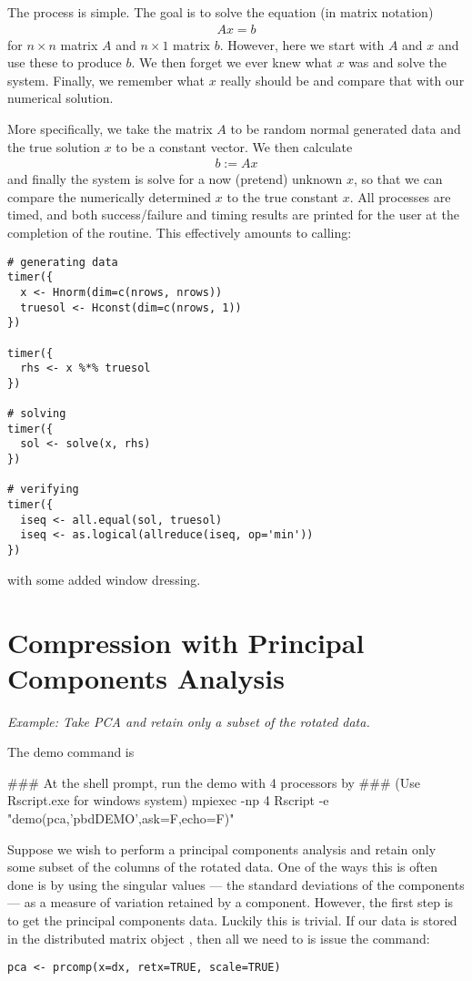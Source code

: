 The process is simple.  The goal is to solve the equation (in matrix notation)
\begin{align*}
Ax=b
\end{align*}
for $n\times n$ matrix $A$ and $n\times 1$ matrix $b$.  However, here we start with $A$ and $x$ and use these to produce $b$.  We then forget we ever knew what $x$ was and solve the system.  Finally, we remember what $x$ really should be and compare that with our numerical solution.
  
More specifically, we take the matrix $A$ to be random normal generated data and the true solution $x$ to be a constant vector.  We then calculate
\begin{align*}
b := Ax
\end{align*}
and finally the system is solve for a now (pretend) unknown $x$, so that we can compare the numerically determined $x$ to the true constant $x$.  All processes are timed, and both success/failure and timing results are printed for the user at the completion of the routine.  This effectively amounts to calling:
\begin{lstlisting}[language=rr,title=Verifying Distributed System Solving]
# generating data
timer({
  x <- Hnorm(dim=c(nrows, nrows))
  truesol <- Hconst(dim=c(nrows, 1))
})

timer({
  rhs <- x %*% truesol
})

# solving
timer({
  sol <- solve(x, rhs)
})

# verifying
timer({
  iseq <- all.equal(sol, truesol)
  iseq <- as.logical(allreduce(iseq, op='min'))
})
\end{lstlisting}
with some added window dressing.







\section{Compression with Principal Components Analysis}

\emph{Example:  Take PCA and retain only a subset of the rotated data.}

The demo command is
\begin{Command}
### At the shell prompt, run the demo with 4 processors by
### (Use Rscript.exe for windows system)
mpiexec -np 4 Rscript -e "demo(pca,'pbdDEMO',ask=F,echo=F)"
\end{Command}

Suppose we wish to perform a principal components analysis and retain only some subset of the columns of the rotated data.  One of the ways this is often done is by using the singular values --- the standard deviations of the components --- as a measure of variation retained by a component.  However, the first step is to get the principal components data.  Luckily this is trivial.  If our data is stored in the distributed matrix object , then all we need to is issue the command:
\begin{lstlisting}[language=rr]
pca <- prcomp(x=dx, retx=TRUE, scale=TRUE)
\end{lstlisting}

